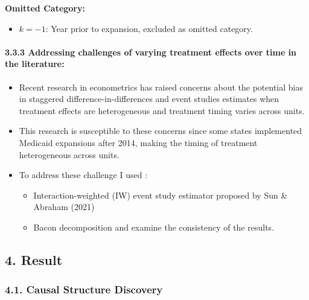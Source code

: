 \documentclass[
]{article}
\providecommand{\tightlist}{%
  \setlength{\itemsep}{0pt}\setlength{\parskip}{0pt}}
\begin{document}
\textbf{Omitted Category:}

\begin{itemize}
\tightlist
\item
  \(k=-1\): Year prior to expansion, excluded as omitted category.
\end{itemize}

\hypertarget{addressing-challenges-of-varying-treatment-effects-over-time-in-the-literature}{%
\paragraph{3.3.3 Addressing challenges of varying treatment effects over
time in the
literature:}\label{addressing-challenges-of-varying-treatment-effects-over-time-in-the-literature}}

\begin{itemize}
\tightlist
\item
  Recent research in econometrics has raised concerns about the
  potential bias in staggered difference-in-differences and event
  studies estimates when treatment effects are heterogeneous and
  treatment timing varies across units.
\item
  This research is susceptible to these concerns since some states
  implemented Medicaid expansions after 2014, making the timing of
  treatment heterogeneous across units.
\item
  To address these challenge I used :

  \begin{itemize}
  \tightlist
  \item
    Interaction-weighted (IW) event study estimator proposed by Sun \&
    Abraham (2021)
  \item
    Bacon decomposition and examine the consistency of the results.
  \end{itemize}
\end{itemize}

\hypertarget{result}{%
\subsection{4. Result}\label{result}}

\hypertarget{causal-structure-discovery}{%
\subsubsection{4.1. Causal Structure
Discovery}\label{causal-structure-discovery}}
\end{document}
